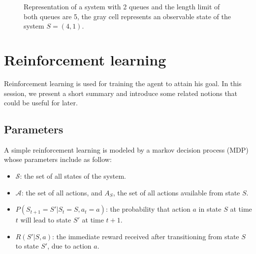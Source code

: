 \documentclass[
  a4paper, xcolor = usenames,dvipsnames]{article}
\providecommand{\tightlist}{%
  \setlength{\itemsep}{0pt}\setlength{\parskip}{0pt}}
\theoremstyle{definition}
\theoremstyle{definition}
\theoremstyle{definition}
\theoremstyle{definition}
\theoremstyle{remark}
\begin{document}
\begin{figure}
\centering
\def\mycolumns{5}
\def\myrows{5}
\caption[Representation of a system with 2 queues]{Representation of a system with 2 queues and the length limit of both queues are 5, the gray cell represents an observable state of the system $S = (4, 1).$}
\end{figure}

\hypertarget{reinforcement-learning}{%
\section{Reinforcement learning}\label{reinforcement-learning}}

Reinforcement learning is used for training the agent to attain his goal. In this session, we present a short summary and introduce some related notions that could be useful for later.

\hypertarget{parameters-2}{%
\subsection{Parameters}\label{parameters-2}}

A simple reinforcement learning is modeled by a markov decision process (MDP) whose parameters include as follow:

\begin{itemize}
\tightlist
\item
  \(\mathcal{S}\): the set of all states of the system.
\item
  \(\mathcal{A}\): the set of all actions, and \(A_{S}\), the set of all actions available from state \(S\).
\item
  \(P(S_{t + 1} = S' | S_{t} = S, a_{t} = a)\): the probability that action \(a\) in state \(S\) at time \(t\) will lead to state \(S'\) at time \(t + 1\).
\item
  \(R(S' | S, a)\): the immediate reward received after transitioning from state \(S\) to state \(S'\), due to action \(a\).
\end{itemize}
\end{document}
